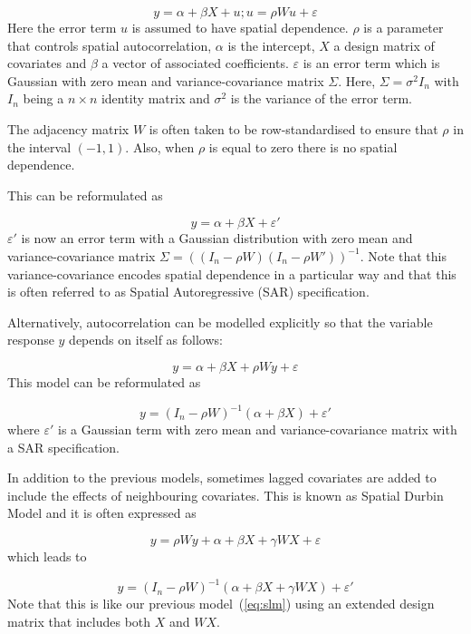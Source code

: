 \documentclass[article]{jss}
\begin{document}
\begin{equation}
y= \alpha+\beta X +u; u=\rho W u+\varepsilon
\end{equation}
\noindent
Here the error term $u$ is assumed to have spatial dependence.  $\rho$ is a
parameter that controls spatial autocorrelation, $\alpha$ is the intercept, $X$
a design matrix of covariates and $\beta$ a vector of associated coefficients.
$\varepsilon$ is an error term which is Gaussian with zero mean and
variance-covariance matrix $\Sigma$. Here, $\Sigma = \sigma^2 I_n$ with $I_n$
being a $n\times n$ identity matrix and $\sigma^2$ is the variance of the error
term.


The adjacency matrix $W$ is often taken to be row-standardised \citep[see, for
example,][]{Haining:2003} to ensure that $\rho$ in the interval $(-1, 1)$.
Also, when $\rho$ is equal to zero there is no spatial dependence.

This can be reformulated as

\begin{equation}
y= \alpha+\beta X+\varepsilon'
\end{equation}
\noindent
$\varepsilon '$ is now an error term with a Gaussian distribution with zero
mean and variance-covariance matrix $\Sigma=((I_n-\rho W)(I_n-\rho W'))^{-1}$.
Note that this variance-covariance encodes spatial dependence in a particular
way and that this is often referred to as Spatial Autoregressive (SAR)
specification.


Alternatively, autocorrelation can be modelled explicitly so that the
variable response $y$ depends on itself as follows:

$$
y= \alpha+\beta X+\rho W y +\varepsilon 
$$
\noindent
This model can be reformulated as

\begin{equation}
y = (I_n-\rho W)^{-1}(\alpha+\beta X)+\varepsilon ' 
\label{eq:slm}
\end{equation}
\noindent
where $\varepsilon '$ is a Gaussian term with zero mean and
variance-covariance matrix with a SAR specification.

In addition to the previous models, sometimes lagged covariates are 
added to include the effects of neighbouring covariates. This is known
as Spatial Durbin Model  and it is often expressed as

$$
y= \rho W y+ \alpha+\beta X+\gamma W X +\varepsilon 
$$
\noindent
which leads to

$$
y= (I_n-\rho W)^{-1}(\alpha+\beta X+\gamma W X) +\varepsilon '
$$
\noindent
Note that this is like our previous model~(\ref{eq:slm}) using an extended
design matrix that includes both $X$ and $W X$.
\end{document}
